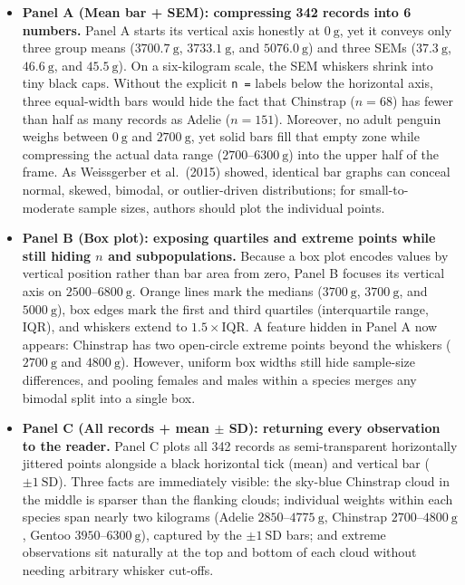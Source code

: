 \begin{itemize}
\item \textbf{Panel A (Mean bar + SEM): compressing 342 records into 6 numbers.} Panel A starts its vertical axis honestly at $0\ \text{g}$, yet it conveys only three group means ($3700.7\ \text{g}$, $3733.1\ \text{g}$, and $5076.0\ \text{g}$) and three SEMs ($37.3\ \text{g}$, $46.6\ \text{g}$, and $45.5\ \text{g}$). On a six-kilogram scale, the SEM whiskers shrink into tiny black caps. Without the explicit \texttt{n =} labels below the horizontal axis, three equal-width bars would hide the fact that Chinstrap ($n = 68$) has fewer than half as many records as Adelie ($n = 151$). Moreover, no adult penguin weighs between $0\ \text{g}$ and $2700\ \text{g}$, yet solid bars fill that empty zone while compressing the actual data range ($2700\text{--}6300\ \text{g}$) into the upper half of the frame. As Weissgerber et al.\ (2015) showed, identical bar graphs can conceal normal, skewed, bimodal, or outlier-driven distributions; for small-to-moderate sample sizes, authors should plot the individual points.

\item \textbf{Panel B (Box plot): exposing quartiles and extreme points while still hiding $n$ and subpopulations.} Because a box plot encodes values by vertical position rather than bar area from zero, Panel B focuses its vertical axis on $2500\text{--}6800\ \text{g}$. Orange lines mark the medians ($3700\ \text{g}$, $3700\ \text{g}$, and $5000\ \text{g}$), box edges mark the first and third quartiles (interquartile range, IQR), and whiskers extend to $1.5 \times \text{IQR}$. A feature hidden in Panel A now appears: Chinstrap has two open-circle extreme points beyond the whiskers ($2700\ \text{g}$ and $4800\ \text{g}$). However, uniform box widths still hide sample-size differences, and pooling females and males within a species merges any bimodal split into a single box.

\item \textbf{Panel C (All records + mean $\pm$ SD): returning every observation to the reader.} Panel C plots all 342 records as semi-transparent horizontally jittered points alongside a black horizontal tick (mean) and vertical bar ($\pm 1\ \text{SD}$). Three facts are immediately visible: the sky-blue Chinstrap cloud in the middle is sparser than the flanking clouds; individual weights within each species span nearly two kilograms (Adelie $2850\text{--}4775\ \text{g}$, Chinstrap $2700\text{--}4800\ \text{g}$, Gentoo $3950\text{--}6300\ \text{g}$), captured by the $\pm 1\ \text{SD}$ bars; and extreme observations sit naturally at the top and bottom of each cloud without needing arbitrary whisker cut-offs.


\end{itemize}
